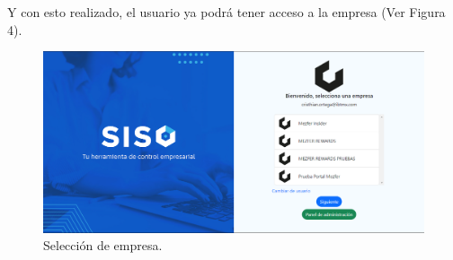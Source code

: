 Y con esto realizado, el usuario ya podrá tener acceso a la empresa (Ver Figura 4).
    \begin{figure}[H]
        \begin{center}
            \includegraphics[scale=0.35]{img/actividades/integracion/ingreso-empresa.png}
            \caption{Selección de empresa.}
            \label{fig:ingreso-empresa}
        \end{center}
    \end{figure}